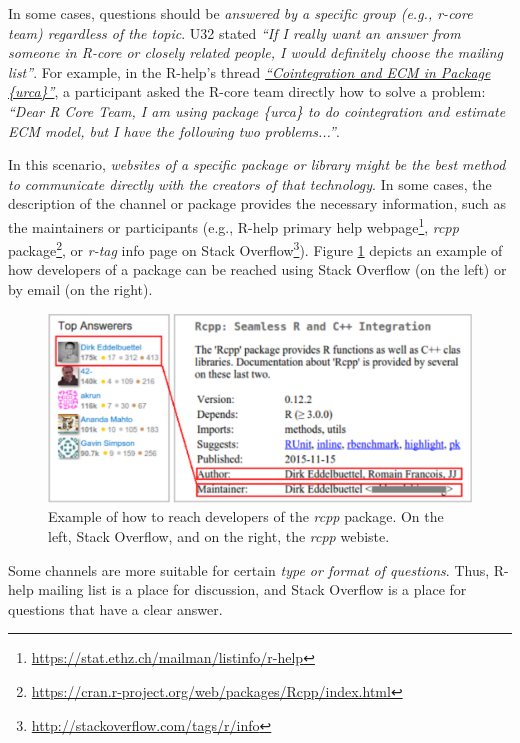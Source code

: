     In some cases, questions should be \emph{answered by a \textit{specific group} (e.g., r-core team) regardless of the topic}.
    U32 stated \textit{``If I really want an answer from someone in R-core or closely related people, I would definitely choose the mailing list''}.
    For example, in the R-help's thread \textit{\href{http://goo.gl/7olLv7}{``Cointegration and ECM in Package \{urca\}''}}, a participant asked the R-core team directly how to solve a problem: \textit{``Dear R Core Team, I am using package \{urca\} to do cointegration and estimate ECM model, but I have the following two problems...''}.

    In this scenario, \emph{websites of a specific package or library might be the best method to communicate directly with the creators of that technology}.
    In some cases, the description of the channel or package provides the necessary information, such as the maintainers or participants (e.g., R-help primary help webpage\footnote{\url{https://stat.ethz.ch/mailman/listinfo/r-help}}, \emph{rcpp} package\footnote{\url{https://cran.r-project.org/web/packages/Rcpp/index.html}}, or \textit{r-tag} info page on Stack Overflow\footnote{\url{http://stackoverflow.com/tags/r/info}}).
    Figure \ref{fig:CCchannel} depicts an example of how developers of a package can be reached using Stack Overflow (on the left) or by email (on the right). 

    \begin{figure} [!htb]
        \centering
        \includegraphics[width=\columnwidth]{Figures/CCchannel}
        \caption{Example of how to reach developers of the \emph{rcpp} package. On the left, Stack Overflow, and on the right, the \emph{rcpp} webiste.}
        \label{fig:CCchannel}
    \end{figure}

    Some channels are more suitable for certain \emph{type or format of questions}. 
    Thus, R-help mailing list is a place for discussion, and Stack Overflow is a place for questions that have a clear answer.


